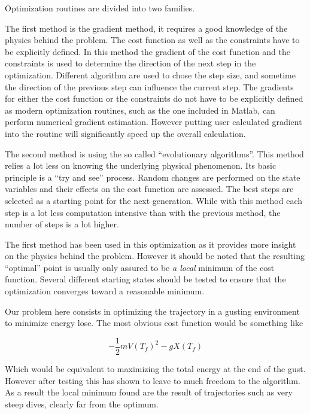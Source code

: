 \par Optimization routines are divided into two families. 

\par The first method is the gradient method, it requires a good knowledge of the physics behind the problem.
The cost function as well as the constraints have to be explicitly defined.
In this method the gradient of the cost function and the constraints is used to determine the direction of the next step in the optimization.
Different algorithm are used to chose the step size, and sometime the direction of the previous step can influence the current step.
The gradients for either the cost function or the constraints do not have to be explicitly defined as modern optimization routines, such as the one included in Matlab, can perform numerical gradient estimation.
However putting user calculated gradient into the routine will significantly speed up the overall calculation.

\par The second method is using the so called ``evolutionary algorithms''. 
This method relies a lot less on knowing the underlying physical phenomenon.
Its basic principle is a ``try and see'' process.
Random changes are performed on the state variables and their effects on the cost function are assessed.
The best steps are selected as a starting point for the next generation.
While with this method each step is a lot less computation intensive than with the previous method, the number of steps is a lot higher.

\par The first method has been used in this optimization as it provides more insight on the physics behind the problem.
However it should be noted that the resulting ``optimal'' point is usually only assured to be \emph{a local} minimum of the cost function.
Several different starting states should be tested to ensure that the optimization converges toward a reasonable minimum.



\par Our problem here consists in optimizing the trajectory in a gusting environment to minimize energy lose.
The most obvious cost function would be something like

\begin{equation}
	- \frac{1}{2}m{V(T_f)}^2 - gX(T_f)
	\label{eqn:eni_cost_fun}
\end{equation}

Which would be equivalent to maximizing the total energy at the end of the gust.
However after testing this has shown to leave to much freedom to the algorithm. 
As a result the local minimum found are the result of trajectories such as very steep dives, clearly far from the optimum.


